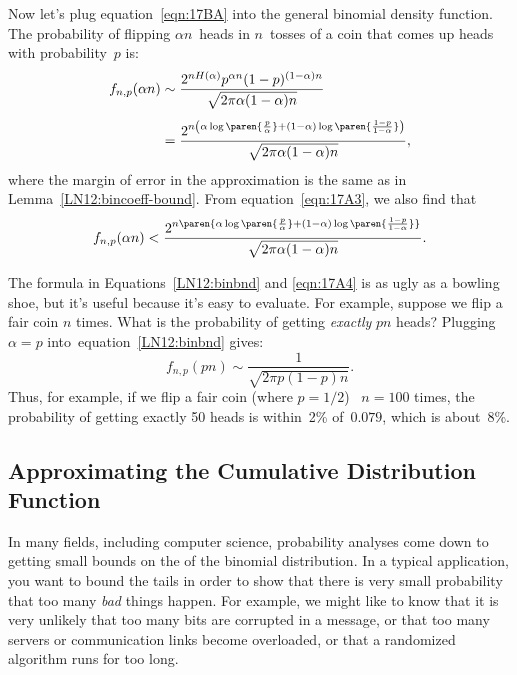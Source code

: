 \begin{editingnotes}
Now let's plug equation~\eqref{eqn:17BA} into the general binomial density
function.  The probability of flipping $\alpha n$~heads in $n$~tosses
of a coin that comes up heads with probability~$p$ is:
\begin{align}
f_{n, p}(\alpha n)
    &\sim \frac{ 2^{n H(\alpha)} p^{\alpha n} (1 - p)^{(1 - \alpha)n} }
            { \sqrt{2 \pi \alpha (1 - \alpha) n} } \notag\\[4pt]
    &= \frac{ 2^{n \left(\alpha \log\paren{\frac{p}{\alpha}}
                    + (1 - \alpha) \log\paren{\frac{1 - p}{1 - \alpha}}\right)} 
            }
            { \sqrt{2 \pi \alpha (1 - \alpha) n} }, \label{LN12:binbnd}
\end{align}
where the margin of error in the approximation is the same as in
Lemma~\ref{LN12:bincoeff-bound}.  From equation~\eqref{eqn:17A3}, we
also find that
\begin{equation}\label{eqn:17A4}
    f_{n, p}(\alpha n) < \frac{ 2^{n \paren{\alpha
        \log\paren{\frac{p}{\alpha}} + (1 - \alpha) \log\paren{\frac{1
          - p}{1 - \alpha}}}} }
                              { \sqrt{2 \pi \alpha (1 - \alpha) n} }.
\end{equation}

The formula in Equations~\ref{LN12:binbnd} and \ref{eqn:17A4} is as
ugly as a bowling shoe, but it's useful because it's easy to evaluate.
For example, suppose we flip a fair coin $n$ times.  What is the
probability of getting \emph{exactly} $pn$ heads?  Plugging $\alpha =
p$ into~equation~\eqref{LN12:binbnd} gives:
%
\begin{equation*}
f_{n, p}(pn)
    \sim \frac{1}{\sqrt{2 \pi p (1 - p) n} }.
\end{equation*}
%
Thus, for example, if we flip a fair coin (where $p = 1/2$) \ $n =
100$ times, the probability of getting exactly 50 heads is within~2\%
of~$0.079$, which is about~8\%.

\subsection{Approximating the Cumulative Distribution Function}

In many fields, including computer science, probability analyses come
down to getting small bounds on the  of the binomial
distribution.  In a typical application, you want to bound the tails
in order to show that there is very small probability that too many
\emph{bad} things happen.  For example, we might like to know that it
is very unlikely that too many bits are corrupted in a message, or
that too many servers or communication links become overloaded, or
that a randomized algorithm runs for too long.


\end{editingnotes}
